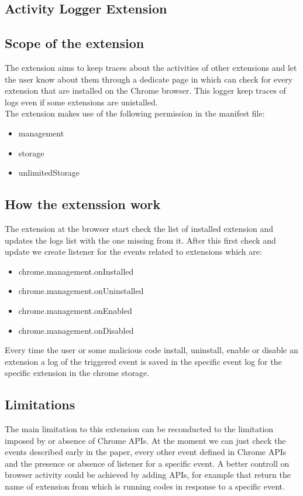 \documentclass[12pt]{article}
\begin{document}
\begin{multicols}{2}
\section{Activity Logger Extension}
\subsection{Scope of the extension}
	The extension aims to keep traces about the activities of other extensions and let the user know
	about them through a dedicate page in which can check for every extension that are installed on the
	Chrome browser. This logger keep traces of logs even if some extensions are unistalled. \\
	The extension makes use of the following permission in the manifest file:
	{\fontsize{10}{10}\selectfont
		\begin{itemize}
			\item  management
			\item  storage
			\item  unlimitedStorage
		\end{itemize}
	}
\subsection{How the extenssion work}
	The extension at the browser start check the list of installed extension and updates the logs list with the one missing from it.
	After this first check and update we create listener for the events related to extensions which are: 
	{\fontsize{10}{10}\selectfont
	\begin{itemize}
		\item  chrome.management.onInstalled
		\item  chrome.management.onUninstalled
		\item  chrome.management.onEnabled
		\item  chrome.management.onDisabled
	\end{itemize}
	}
	Every time the user or some malicious code install, uninstall, enable or disable an extension a log of the triggered event is saved in the specific event log for the specific extension in the chrome storage.
\subsection{Limitations}
	The main limitation to this extension can be reconducted to the limitation imposed by or absence of Chrome APIs.
	At the moment we can just check the events described early in the paper, every other event defined in Chrome APIs and the presence or absence of listener for a specific event.
	A better controll on browser activity could be achieved by adding APIs, for example that return the name of extension from which is running codes in response to a specific event.

\end{multicols}
\end{document}
